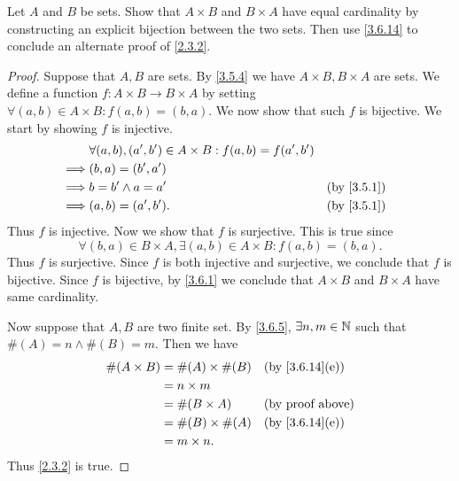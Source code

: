\begin{ex}\label{ex:3.6.5}
	Let \(A\) and \(B\) be sets.
	Show that \(A \times B\) and \(B \times A\) have equal cardinality by constructing an explicit bijection between the two sets.
	Then use \cref{3.6.14} to conclude an alternate proof of \cref{2.3.2}.
\end{ex}

\begin{proof}
	Suppose that \(A, B\) are sets.
	By \cref{3.5.4} we have \(A \times B, B \times A\) are sets.
	We define a function \(f : A \times B \to B \times A\) by setting \(\forall (a, b) \in A \times B : f(a, b) = (b, a)\).
	We now show that such \(f\) is bijective.
	We start by showing \(f\) is injective.
	\begin{align*}
		         & \forall (a, b), (a', b') \in A \times B : f(a, b) = f(a', b')                 \\
		\implies & (b, a) = (b', a')                                                             \\
		\implies & b = b' \land a = a'                                           &  & \by{3.5.1} \\
		\implies & (a, b) = (a', b').                                            &  & \by{3.5.1}
	\end{align*}
	Thus \(f\) is injective.
	Now we show that \(f\) is surjective.
	This is true since
	\[
		\forall (b, a) \in B \times A, \exists (a, b) \in A \times B : f(a, b) = (b, a).
	\]
	Thus \(f\) is surjective.
	Since \(f\) is both injective and surjective, we conclude that \(f\) is bijective.
	Since \(f\) is bijective, by \cref{3.6.1} we conclude that \(A \times B\) and \(B \times A\) have same cardinality.

	Now suppose that \(A, B\) are two finite set.
	By \cref{3.6.5}, \(\exists n, m \in \mathbb{N}\) such that \(\#(A) = n \land \#(B) = m\).
	Then we have
	\begin{align*}
		\#(A \times B) & = \#(A) \times \#(B) &  & \text{(by \cref{3.6.14}(e))} \\
		               & = n \times m                                           \\
		               & = \#(B \times A)     &  & \text{(by proof above)}      \\
		               & = \#(B) \times \#(A) &  & \text{(by \cref{3.6.14}(e))} \\
		               & = m \times n.
	\end{align*}
	Thus \cref{2.3.2} is true.
\end{proof}

